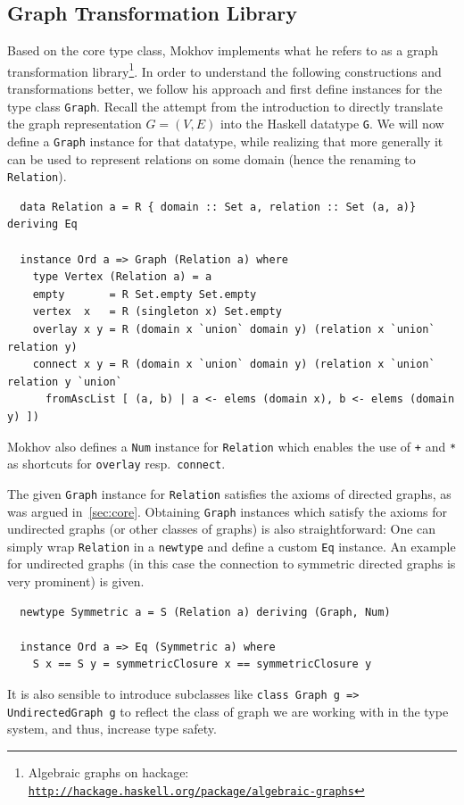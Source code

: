 \documentclass{article}
\newcommand{\hs}{\texttt}
\begin{document}
\subsection{Graph Transformation Library}\label{sec:trafo}
Based on the core type class, Mokhov implements what he refers to as a graph
transformation library\footnote{Algebraic graphs on hackage:
  \texttt{\href{http://hackage.haskell.org/package/algebraic-graphs}{http://hackage.haskell.org/package/algebraic-graphs}}}.
In order to understand the following constructions and transformations better,
we follow his approach and first define instances for the type class
\hs{Graph}. Recall the attempt from the introduction to directly translate the
graph representation $G=(V,E)$ into the Haskell datatype \hs{G}. We will now
define a \hs{Graph} instance for that datatype, while realizing that more
generally it can be used to represent relations on some domain (hence the renaming
to \hs{Relation}).
\begin{verbatim}
  data Relation a = R { domain :: Set a, relation :: Set (a, a)} deriving Eq

  instance Ord a => Graph (Relation a) where
    type Vertex (Relation a) = a
    empty       = R Set.empty Set.empty
    vertex  x   = R (singleton x) Set.empty
    overlay x y = R (domain x `union` domain y) (relation x `union` relation y)
    connect x y = R (domain x `union` domain y) (relation x `union` relation y `union`
      fromAscList [ (a, b) | a <- elems (domain x), b <- elems (domain y) ])
\end{verbatim}
Mokhov also defines a \hs{Num} instance for \hs{Relation} which enables the use
of \hs{+} and \hs{*} as shortcuts for \hs{overlay} resp.\ \hs{connect}.

The given \hs{Graph} instance for \hs{Relation} satisfies the axioms of directed
graphs, as was argued in~\autoref{sec:core}. Obtaining \hs{Graph} instances
which satisfy the axioms for undirected graphs (or other classes of graphs) is
also straightforward: One can simply wrap \hs{Relation} in a \hs{newtype} and
define a custom \hs{Eq} instance. An example for undirected graphs (in this case
the connection to symmetric directed graphs is very prominent) is given.
\begin{verbatim}
  newtype Symmetric a = S (Relation a) deriving (Graph, Num)

  instance Ord a => Eq (Symmetric a) where
    S x == S y = symmetricClosure x == symmetricClosure y
\end{verbatim}
It is also sensible to introduce subclasses like \hs{class Graph g => UndirectedGraph g}
to reflect the class of graph we are working with in the type system, and thus,
increase type safety.
\end{document}
